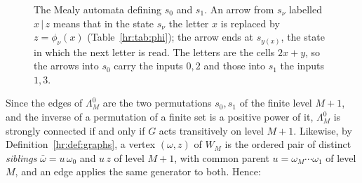 \begin{figure}[ht]
\centering
{}
\caption{The Mealy automata defining $s_0$ and $s_1$. An arrow from $s_\nu$ labelled $x\,|\,z$ means that in the state $s_\nu$ the letter $x$ is replaced by $z=\phi_\nu(x)$ (Table~\ref{hr:tab:phi}); the arrow ends at $s_{y(x)}$, the state in which the next letter is read. The letters are the cells $2x+y$, so the arrows into $s_0$ carry the inputs $0,2$ and those into $s_1$ the inputs $1,3$.}
\label{hr:fig:mealy}
\end{figure}

Since the edges of $\Lambda^0_M$ are the two permutations $s_0,s_1$ of the finite level $M+1$, and the inverse of a permutation of a finite set is a positive power of it, $\Lambda^0_M$ is strongly connected if and only if $G$ acts transitively on level $M+1$. Likewise, by Definition~\ref{hr:def:graphs}, a vertex $(\omega,z)$ of $W_M$ is the ordered pair of distinct \emph{siblings} $\bar\omega=u\,\omega_0$ and $u\,z$ of level $M+1$, with common parent $u=\omega_M\cdots\omega_1$ of level $M$, and an edge applies the same generator to both. Hence:

